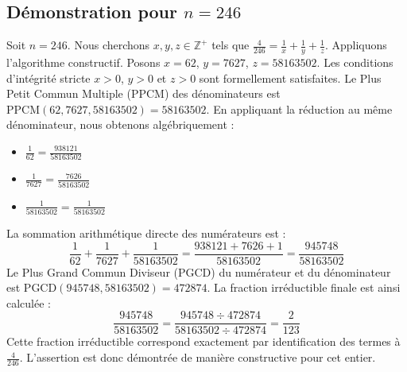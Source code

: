 \documentclass[11pt,a4paper]{article}
\begin{document}
\subsection{Démonstration pour $n = 246$}
Soit $n = 246$. Nous cherchons $x, y, z \in \mathbb{Z}^{+}$ tels que $\frac{4}{246} = \frac{1}{x} + \frac{1}{y} + \frac{1}{z}$.
Appliquons l'algorithme constructif. Posons $x = 62$, $y = 7627$, $z = 58163502$.
Les conditions d'intégrité stricte $x > 0$, $y > 0$ et $z > 0$ sont formellement satisfaites.
Le Plus Petit Commun Multiple (PPCM) des dénominateurs est $\text{PPCM}(62, 7627, 58163502) = 58163502$.
En appliquant la réduction au même dénominateur, nous obtenons algébriquement :
\begin{itemize}
    \item $\frac{1}{62} = \frac{938121}{58163502}$
    \item $\frac{1}{7627} = \frac{7626}{58163502}$
    \item $\frac{1}{58163502} = \frac{1}{58163502}$
\end{itemize}
La sommation arithmétique directe des numérateurs est :
$$ \frac{1}{62} + \frac{1}{7627} + \frac{1}{58163502} = \frac{938121 + 7626 + 1}{58163502} = \frac{945748}{58163502} $$
Le Plus Grand Commun Diviseur (PGCD) du numérateur et du dénominateur est $\text{PGCD}(945748, 58163502) = 472874$.
La fraction irréductible finale est ainsi calculée :
$$ \frac{945748}{58163502} = \frac{945748 \div 472874}{58163502 \div 472874} = \frac{2}{123} $$
Cette fraction irréductible correspond exactement par identification des termes à $\frac{4}{246}$. L'assertion est donc démontrée de manière constructive pour cet entier.
\end{document}
